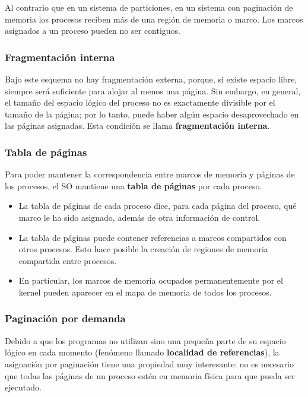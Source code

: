 \documentclass[spanish,a4paper,]{article}
\begin{document}
Al contrario que en un sistema de particiones, en un sistema con
paginación de memoria los procesos reciben más de una región de memoria
o marco. Los marcos asignados a un proceso pueden no ser contiguos.

\hypertarget{fragmentaciuxf3n-interna}{%
\subsubsection{Fragmentación interna}\label{fragmentaciuxf3n-interna}}

Bajo este esquema no hay fragmentación externa, porque, si existe
espacio libre, siempre será suficiente para alojar al menos una página.
Sin embargo, en general, el tamaño del espacio lógico del proceso no es
exactamente divisible por el tamaño de la página; por lo tanto, puede
haber algún espacio desaprovechado en las páginas asignadas. Esta
condición se llama \textbf{fragmentación interna}.

\hypertarget{tabla-de-puxe1ginas}{%
\subsubsection{Tabla de páginas}\label{tabla-de-puxe1ginas}}

Para poder mantener la correspondencia entre marcos de memoria y páginas
de los procesos, el SO mantiene una \textbf{tabla de páginas} por cada
proceso.

\begin{itemize}
\item
  La tabla de páginas de cada proceso dice, para cada página del
  proceso, qué marco le ha sido asignado, además de otra información de
  control.
\item
  La tabla de páginas puede contener referencias a marcos compartidos
  con otros procesos. Esto hace posible la creación de regiones de
  memoria compartida entre procesos.
\item
  En particular, los marcos de memoria ocupados permanentemente por el
  kernel pueden aparecer en el mapa de memoria de todos los procesos.
\end{itemize}

\hypertarget{paginaciuxf3n-por-demanda}{%
\subsubsection{Paginación por demanda}\label{paginaciuxf3n-por-demanda}}

Debido a que los programas no utilizan sino una pequeña parte de su
espacio lógico en cada momento (fenómeno llamado \textbf{localidad de
referencias}), la asignación por paginación tiene una propiedad muy
interesante: no es necesario que todas las páginas de un proceso estén
en memoria física para que pueda ser ejecutado.
\end{document}
